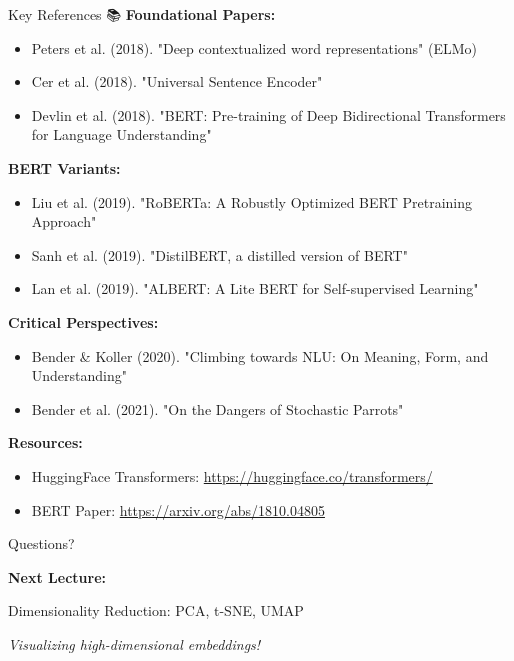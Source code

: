 \documentclass[aspectratio=169]{beamer}
\begin{document}
\begin{frame}[shrink=10]{Key References 📚}
\small
\textbf{Foundational Papers:}
\begin{itemize}\setlength{\itemsep}{0pt}
    \item Peters et al. (2018). "Deep contextualized word representations" (ELMo)
    \item Cer et al. (2018). "Universal Sentence Encoder"
    \item Devlin et al. (2018). "BERT: Pre-training of Deep Bidirectional Transformers for Language Understanding"
\end{itemize}

\vspace{0.5em}
\textbf{BERT Variants:}
\begin{itemize}\setlength{\itemsep}{0pt}
    \item Liu et al. (2019). "RoBERTa: A Robustly Optimized BERT Pretraining Approach"
    \item Sanh et al. (2019). "DistilBERT, a distilled version of BERT"
    \item Lan et al. (2019). "ALBERT: A Lite BERT for Self-supervised Learning"
\end{itemize}

\vspace{0.5em}
\textbf{Critical Perspectives:}
\begin{itemize}\setlength{\itemsep}{0pt}
    \item Bender \& Koller (2020). "Climbing towards NLU: On Meaning, Form, and Understanding"
    \item Bender et al. (2021). "On the Dangers of Stochastic Parrots"
\end{itemize}

\vspace{0.5em}
\textbf{Resources:}
\begin{itemize}\setlength{\itemsep}{0pt}
    \item HuggingFace Transformers: \url{https://huggingface.co/transformers/}
    \item BERT Paper: \url{https://arxiv.org/abs/1810.04805}
\end{itemize}
\end{frame}

\begin{frame}{Questions? 🙋}
\begin{center}
\LARGE
\textbf{Next Lecture:}

\vspace{1em}
Dimensionality Reduction: PCA, t-SNE, UMAP

\vspace{1em}
\textit{Visualizing high-dimensional embeddings!}
\end{center}
\end{frame}
\end{document}

